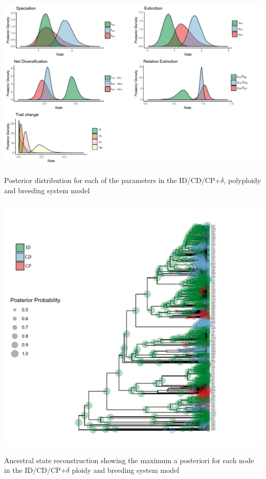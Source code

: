 \begin{suppfigure}
\includegraphics[width=\textwidth]{musseDPSIposteriordist.pdf}
\caption{Posterior distribution for each of the parameters in the ID/CD/CP+$\delta$, polyploidy and breeding system model} %
\label{suppfigure:IDCDCP}
\end{suppfigure}

\begin{suppfigure}
\includegraphics[width=\textwidth]{asrIDCDCPdelta.pdf}
\caption{Ancestral state reconstruction showing the maximum a posteriori for each node in the ID/CD/CP+$\delta$ ploidy and breeding system model} %
\label{suppfigure:IDCDCPasr}
\end{suppfigure}


